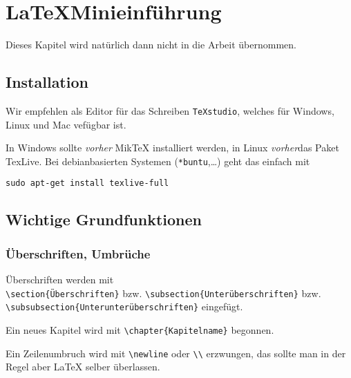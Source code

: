 \chapter*{\LaTeX Minieinführung}
	Dieses Kapitel wird natürlich dann nicht in die Arbeit übernommen.

\section{Installation}
	Wir empfehlen als Editor für das Schreiben \verb"TeXstudio", welches für Windows, Linux und Mac vefügbar ist.
	
	In Windows sollte \emph{vorher} MikTeX installiert werden, in Linux \emph{vorher}das Paket TexLive. Bei debianbasierten Systemen (\verb"*buntu",\dots) geht das einfach mit
	
	\verb"sudo apt-get install texlive-full"
	
	  
\section{Wichtige Grundfunktionen}

	\subsection{Überschriften, Umbrüche}
		Überschriften werden mit\\
		 \verb"\section{Überschriften}" bzw. \verb"\subsection{Unterüberschriften}" bzw.\\ \verb"\subsubsection{Unterunterüberschriften}" eingefügt.
		
		Ein neues Kapitel wird mit \verb"\chapter{Kapitelname}" begonnen.
		
		Ein Zeilenumbruch wird mit \verb"\newline" oder \verb"\\" erzwungen, das sollte man in der Regel aber \LaTeX{} selber überlassen.
		

